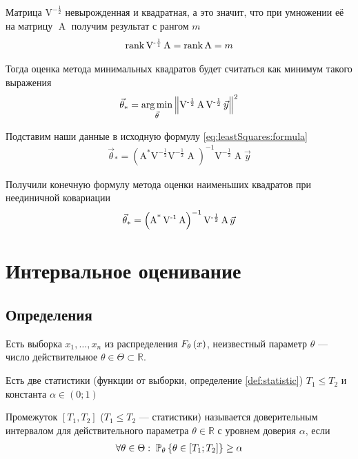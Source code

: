 Матрица $\operatorname{V^{-\frac{1}{2}}}$ невырожденная и квадратная, а это
значит, что при умножении её на матрицу $\operatorname{A}$ получим результат
с рангом $m$
\begin{align*}
    \rank{\operatorname{V^{-\frac{1}{1}}} \operatorname{A}}
    = \rank{\operatorname{A}}
    = m
\end{align*}

Тогда оценка метода минимальных квадратов будет считаться как минимум такого
выражения
\begin{align*}
    \vec{\theta}_*
    = \argminof{\left\| \operatorname{V^{-\frac{1}{2}}} \operatorname{A}
        \operatorname{V^{-\frac{1}{2}}} \vec{y} \right\|^2}{\vec{\theta}}
\end{align*}

Подставим наши данные в исходную формулу \eqref{eq:leastSquares:formula}
\begin{align*}
    \vec{\theta}_*
    = \left( \operatorname{A^*} \operatorname{V^{-\frac{1}{2}}}
            \operatorname{V^{-\frac{1}{2}}} \operatorname{A} \right)^{-1}
        \operatorname{V^{-\frac{1}{2}}} \operatorname{A} \vec{y}
\end{align*}

Получили конечную формулу метода оценки наименьших квадратов при неединичной
ковариации
\begin{equation}\label{eq:leastSquares:formulaAdvanced}
    \index{оценка!метода наименьших квадратов!формула}
    \vec{\theta}_*
    = \left( \operatorname{A^*} \operatorname{V^{-1}}
            \operatorname{A} \right)^{-1}
        \operatorname{V^{-\frac{1}{2}}} \operatorname{A} \vec{y}
\end{equation}

\section{Интервальное оценивание}
\subsection{Определения}

Есть выборка $x_1, \dots, x_n$ из распределения $\cdfof{\theta}{x}$,
неизвестный параметр $\theta$ --- число действительное
$\theta \in \Theta \subset \mathbb{R}$.

Есть две статистики (функции от выборки, определение \ref{def:statistic})
$T_1 \le T_2$ и константа $\alpha \in \left( 0; 1 \right)$

\begin{definition}
    Промежуток $\left[ T_1, T_2 \right]$ ($T_1 \le T_2$ --- статистики)
    называется доверительным интервалом для действительного параметра
    $\theta \in \mathbb{R}$ с уровнем доверия $\alpha$, если
    \begin{align*}
        \forall \theta \in \Theta:\;
        \Probability[\theta]{\theta \in \left[ T_1; T_2 \right]} \ge \alpha
    \end{align*}
\end{definition}

